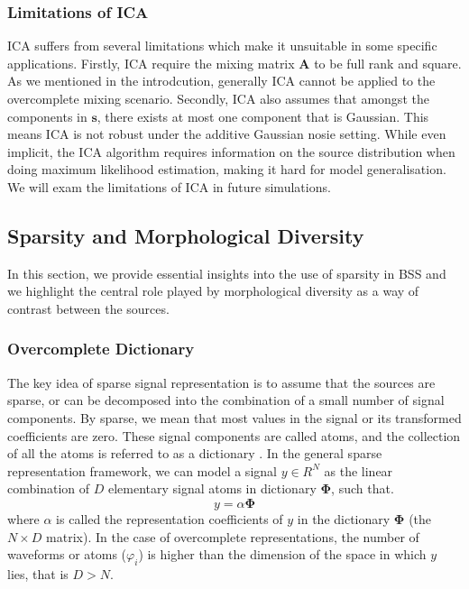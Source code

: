 \subsubsection{Limitations of ICA}
ICA suffers from several limitations which make it unsuitable in some specific applications. Firstly, ICA require the mixing matrix $\mathbf{A}$ to be full rank and square. As we mentioned in the introdcution, generally ICA cannot be applied to the overcomplete mixing scenario. Secondly, ICA also assumes that amongst the components in $\mathbf{s}$, there exists at most one component that is Gaussian. This means ICA is not robust under the additive Gaussian nosie setting. While even implicit, the ICA algorithm requires information on the source distribution when doing maximum likelihood estimation, making it hard for model generalisation. We will exam the limitations of ICA in future simulations.

\subsection{Sparsity and Morphological Diversity}
In this section, we provide essential insights into the use of sparsity in BSS and we highlight the central role played by morphological diversity as a way of contrast between the sources.

\subsubsection{Overcomplete Dictionary}
The key idea of sparse signal representation is to assume
that the sources are sparse, or can be decomposed into the
combination of a small number of signal components. By
sparse, we mean that most values in the signal or its transformed coefficients are zero. These signal components are called atoms, and the collection of all the atoms is referred to as a dictionary \cite{Mallat_Zhang1993}. In the general sparse representation framework, we can model a signal $y \in R^N$ as the linear combination of $D$ elementary signal atoms in dictionary $\mathbf{\Phi}$, such that.
\begin{equation}
    y = \alpha \mathbf{\Phi}
    \label{dict_qe1}
\end{equation}
where $\alpha$ is called the representation coefficients of $y$ in the dictionary $\mathbf{\Phi}$
(the $N \times D$ matrix). 
In the case of overcomplete representations, the number of waveforms or atoms ($\varphi_i$) is higher than the dimension of the space in which $y$ lies, that is $D > N$. 

